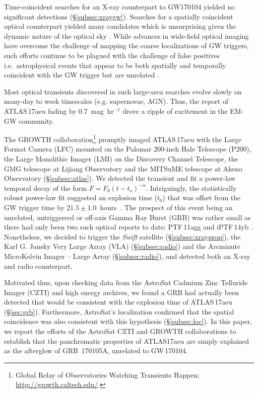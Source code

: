 \documentclass[twocolumn]{aastex6}
\begin{document}
Time-coincident searches for an X-ray counterpart to GW170104 yielded no significant detections (\S\ref{subsec:xraygw}). Searches for a spatially coincident optical counterpart yielded many candidates which is unsurprising given the dynamic nature of the optical sky \citep{GW_Global,GW170104_ATLAS,GW_Global2nd,GW_EWE,GW_iPTF,GW_CiPTF,GW_PANSTAR,GW_GLOBALOT}. While advances in wide-field optical imaging have overcome the challenge of mapping the coarse localizations of GW triggers, such efforts continue to be plagued with the challenge of false positives i.e.\ astrophysical events that appear to be both spatially and temporally coincident with the GW trigger but are unrelated \citep[and references therein]{aaa+16}. 

Most optical transients discovered in such large-area searches evolve slowly  on many-day to week timescales (e.g. supernovae, AGN). Thus, the report of ATLAS\,17aeu \citep{GW170104_ATLAS} fading by 0.7~mag~hr$^{-1}$ drove a ripple of excitement in the EM-GW community. 

The GROWTH collaboration\footnote{Global Relay of Observatories Watching Transients Happen; \url{http://growth.caltech.edu/}.} promptly imaged ATLAS\,17aeu with the Large Format Camera (LFC) mounted on the Palomar 200-inch Hale Telescope (P200),  the Large Monolithic Imager (LMI) on the Discovery Channel Telescope, the GMG telescope at Lijiang Observatory and the MITSuME telescope at Akeno Observatory (\S\ref{subsec:atlas}). We detected the transient and fit a power-law temporal decay of the form $F = F_0 (t - t_o)^{-\alpha}$. Intriguingly, the statistically robust power-law fit suggested an explosion time ($t_0$) that was offset from the GW trigger time by $21.5\pm1.0$~hours~\citep{GW170104_Palo}. The prospect of this event being an unrelated, untriggerred or off-axis Gamma Ray Burst (GRB) was rather small as there had only been two such optical reports to date: PTF\,11agg \citep{ckh+13} and iPTF\,14yb \citep{cup+15}. Nonetheless, we decided to trigger the {\em Swift} satellite (\S\ref{subsec:xrayprop}), the Karl G. Jansky Very Large Array (VLA) (\S\ref{subsec:radio}) and the Arcminute MicroKelvin Imager -- Large Array (\S\ref{subsec:radio}), and detected both an X-ray and radio counterpart. 

Motivated thus, upon checking data from the AstroSat Cadmium Zinc Telluride Imager (CZTI) and high energy archives, we found a GRB had actually been detected that would be consistent with the explosion time of ATLAS\,17aeu (\S\ref{sec:grb}). Furthermore,
AstroSat's localization confirmed that the spatial coincidence was also consistent with this hypothesis (\S\ref{subsec:loc}). In this paper, we report the efforts of the AstroSat CZTI and GROWTH collaborations to establish that the panchromatic properties of ATLAS17aeu are simply explained as the afterglow of GRB~170105A, unrelated to GW\,170104.
\end{document}
